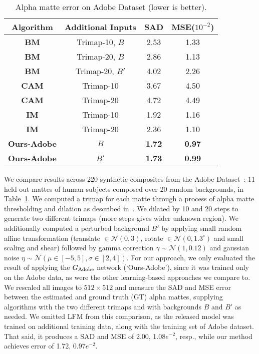 \documentclass[10pt,twocolumn,letterpaper]{article}
\begin{document}
\begin{table}
\vspace{-0.5em}
\setlength\tabcolsep{2pt}
	\centering
	\small
	\captionsetup{justification=centering}
\begin{tabular}{cccc}
			\toprule
			 Algorithm & Additional Inputs & SAD & MSE($10^{-2}$) \\ 
			\midrule
			\textbf{BM} & Trimap-10, $B$ & 2.53& 1.33\\
			\textbf{BM} & Trimap-20, $B$ & 2.86& 1.13\\
			\textbf{BM} & Trimap-20, $B'$ & 4.02& 2.26\\
			\midrule
			\textbf{CAM} & Trimap-10 & 3.67& 4.50\\
			\textbf{CAM} & Trimap-20 & 4.72& 4.49\\
			\midrule
			\textbf{IM} & Trimap-10 & 1.92& 1.16\\
			\textbf{IM} & Trimap-20 & 2.36& 1.10\\
			\midrule
\textbf{Ours-Adobe} & $B$ & \textbf{1.72}& \textbf{0.97}\\
			\textbf{Ours-Adobe} & $B'$ & \textbf{1.73}& \textbf{0.99}\\
			\bottomrule
		\end{tabular}
		\caption{\small Alpha matte error on Adobe Dataset (lower is better).}
	\vspace{-1.5em}
	\label{tab:adobe}
\end{table}

We compare results across 220 synthetic composites from the Adobe Dataset~\cite{xu2017deep}: 11 held-out mattes of human subjects composed over 20 random backgrounds, in Table~\ref{tab:adobe}. We computed a trimap for each matte through a process of alpha matte thresholding and dilation as described in~\cite{xu2017deep}. We dilated by 10 and 20 steps to generate two different trimaps (more steps gives wider unknown region).  We additionally computed a perturbed background $B'$ by applying small random affine transformation (translate $\in \mathcal{N}(0,3)$, rotate $\in \mathcal{N}(0,1.3^{\circ})$ and small scaling and shear) followed by gamma correction $\gamma \sim \mathcal{N}(1,0.12)$ and gaussian noise $\eta \sim \mathcal{N}(\mu \in [-5,5],\sigma \in [2,4])$.  For our approach, we only evaluated the result of applying the $G_{\rm Adobe}$ network (`Ours-Adobe'), since it was trained only on the Adobe data, as were the other learning-based approaches we compare to. We rescaled all images to $512\times512$ and measure the SAD and MSE error between the estimated and ground truth (GT) alpha mattes, supplying algorithms with the two different trimaps and with backgrounds $B$ and $B'$ as needed.  We omitted LFM from this comparison, as the released model was trained on additional training data, along with the training set of Adobe dataset. That said, it produces a SAD and MSE of 2.00, 1.08$e^{-2}$, resp., while our method achieves error of 1.72, 0.97$e^{-2}$.
\end{document}

